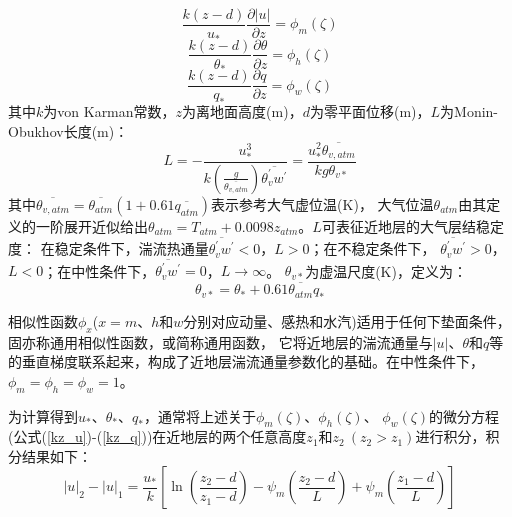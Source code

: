 \begin{equation}\label{kz_u}
\frac{k(z-d)}{u_{*}} \frac{\partial|u|}{\partial z}=\phi_{m}(\zeta)
\end{equation}
\begin{equation}\label{kz_theta}
\frac{k(z-d)}{\theta_{*}} \frac{\partial \theta}{\partial z}=\phi_{h}(\zeta)
\end{equation}
\begin{equation}\label{kz_q}
\frac{k(z-d)}{q_{*}} \frac{\partial q}{\partial z}=\phi_{w}(\zeta)
\end{equation}
其中$k$为von Karman常数，$z$为离地面高度(m)，$d$为零平面位移(m)，$L$为Monin-Obukhov长度(m)：
\begin{equation}\label{ObukL}
L=-\frac{u_{*}^{3}}{k\left(\frac{g}{\overline{\theta_{v, atm}}}\right) \overline{\theta_{v}^{\prime} w^{\prime}}}=\frac{u_{*}^{2} \overline{\theta_{v, atm}}}{k g \theta_{v *}}
\end{equation}
其中$\overline{\theta_{v,atm}}=\overline{\theta_{atm}}(1+0.61\overline{q_{atm}})$表示参考大气虚位温(K)，
 大气位温$\theta_{atm}$由其定义的一阶展开近似给出$\theta_{atm}=T_{atm}+0.0098z_{atm}$。$L$可表征近地层的大气层结稳定度：
 在稳定条件下，湍流热通量$\overline{\theta_v^\prime w^\prime}<0$，$L>0$；在不稳定条件下，
 $\overline{\theta_v^\prime w^\prime}>0$，$L<0$；在中性条件下，$\overline{\theta_v^\prime w^\prime}=0$，$L\rightarrow\infty$。
$\theta_{v\ast}$为虚温尺度(K)，定义为：
\begin{equation}\label{thvstar}
\theta_{v\ast}=\theta_\ast+0.61\overline{\theta_{atm}}q_\ast
\end{equation}

相似性函数$\phi_x$($x=m$、$h$和$w$分别对应动量、感热和水汽)适用于任何下垫面条件，固亦称通用相似性函数，或简称通用函数，
它将近地层的湍流通量与$\left|u\right|$、$\theta$和$q$等的垂直梯度联系起来，构成了近地层湍流通量参数化的基础。在中性条件下，$\phi_m=\phi_h=\phi_w=1$。



为计算得到$u_\ast$、$\theta_\ast$、$q_\ast$，通常将上述关于$\phi_m\left(\zeta\right)$、$\phi_h\left(\zeta\right)$、
$\phi_w(\zeta)$的微分方程(公式(\ref{kz_u})-(\ref{kz_q}))在近地层的两个任意高度$z_1$和$z_2\ (z_2>z_1)$进行积分，积分结果如下：
\begin{equation}
|u|_{2}-|u|_{1}=\frac{u_{*}}{k}\left[\ln \left(\frac{z_{2}-d}{z_{1}-d}\right)-\psi_{m}\left(\frac{z_{2}-d}{L}\right)+\psi_{m}\left(\frac{z_{1}-d}{L}\right)\right]
\end{equation}

